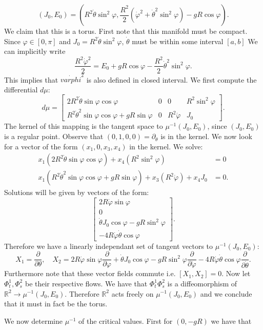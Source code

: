 \documentclass[12pt, a4paper]{article}
\theoremstyle{definition}
\newcommand{\R}{\mathbb{R}}                           %
\newcommand{\bmat}[1]{\begin{bmatrix}#1\end{bmatrix}}
\begin{document}
	$$ (J_0, E_0 ) = \left( R^2 \dot{\theta} \sin^2 \varphi , \frac{ R^2 }{ 2 } \left( \dot{\varphi}^2  + \dot{\theta}^2 \sin^2 \varphi \right)  - gR \cos \varphi\right) .$$
We claim that this is a torus. First note that this manifold must be compact. Since $\varphi \in [0,\pi]$ and $J_0 = R^2 \dot{\theta} \sin^2\varphi$, $\dot{\theta}$ must be within some interval $[a,b]$ We can implicitly write 
$$ \frac{ R^2 \dot{\varphi}^2 }{ 2 } = E_0 + gR \cos \varphi - \frac{ R^2 }{ 2 }\dot{\theta}^2 \sin^2 \varphi.$$
This implies that $\dot{varphi}^2$ is also defined in closed interval.
We first compute the differential $d\mu$:
$$ d\mu = \bmat{2 R^2 \dot{\theta} \sin \varphi \cos \varphi & 0 & 0 & R^2 \sin^2 \varphi 
\\ R^2 \dot{\theta}^2 \sin \varphi \cos \varphi + gR \sin \varphi & 0 & R^2 \dot{\varphi} & J_0}.$$
The kernel of this mapping is the tangent space to $\mu^{-1}(J_0, E_0)$, since $(J_0, E_0)$ is a regular point. Observe that $(0,1,0,0) = \partial_\theta$ is in the kernel. We now look for a vector of the form $(x_1,0,x_3,x_4)$ in the kernel. We solve: 
\begin{align*}
x_1 \left( 2R^2 \dot{\theta} \sin \varphi \cos \varphi \right)+ x_4 \left( R^2 \sin^2 \varphi \right) & = 0
	\\ x_1 \left( R^2 \dot{\theta}^2 \sin \varphi \cos \varphi + gR \sin \varphi \right) + x_3 \left(  R^2 \dot{\varphi} \right) + x_4 J_0 & = 0.
\end{align*}
Solutions will be given by vectors of the form:
$$ \bmat{2 R \dot{\varphi} \sin \varphi \\0 \\  \dot{\theta} J_0 \cos \varphi - gR \sin^2 \varphi \\-4R \dot{\varphi} \dot{\theta} \cos \varphi } .$$
Therefore we have a linearly independant set of tangent vectors to $\mu^{-1}(J_0,E_0)$: $$ X_1 = \frac{\partial }{ \partial \theta },\quad X_2 = 2 R \dot{\varphi} \sin \varphi \frac{ \partial  }{ \partial \varphi }+  \dot{\theta} J_0 \cos \varphi - gR \sin^2 \varphi \frac{ \partial  }{ \partial \dot{\varphi} }  -4R \dot{\varphi} \dot{\theta} \cos \varphi   \frac{ \partial  }{ \partial \dot{\theta} }.$$  
Furthermore note that these vector fields commute i.e. $[X_1,X_2]=0$. Now let $\Phi^1_t, \Phi_s^2$ be their respective flows. We have that $\Phi_t^1 \Phi_s^2$ is a diffeomorphism of $\R^2 \to \mu^{-1}(J_0,E_0)$. Therefore $\R^2$ acts freely on $\mu^{-1}(J_0,E_0)$ and we conclude that it must in fact be the torus. 
\item We now determine $\mu^{-1}$ of the critical values. First for $ \left(0 , -gR \right) $ we have that 
\end{document}
